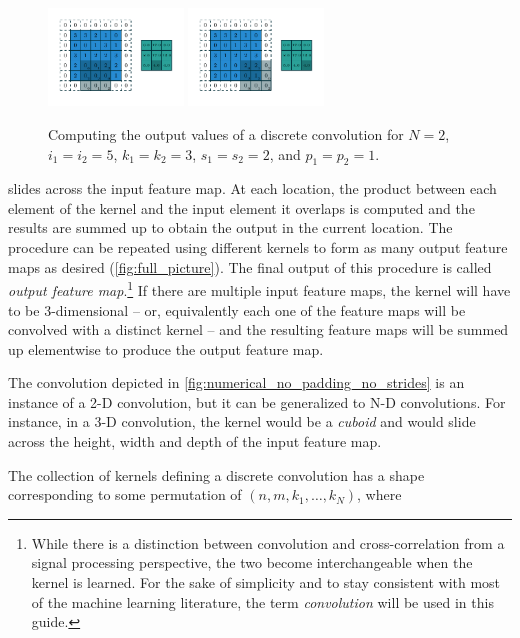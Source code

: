 \documentclass[notitlepage]{report}
\begin{document}
\begin{figure}[p]
    \includegraphics[width=0.32\textwidth]{pdf/numerical_padding_strides_07.pdf}
    \includegraphics[width=0.32\textwidth]{pdf/numerical_padding_strides_08.pdf}
    \caption{\label{fig:numerical_padding_strides} Computing the output values
        of a discrete convolution for $N = 2$, $i_1 = i_2 = 5$, $k_1 = k_2 = 3$,
        $s_1 = s_2 = 2$, and $p_1 = p_2 = 1$.}
\end{figure}

\noindent slides across the input feature map. At each location, the product
between each element of the kernel and the input element it overlaps is computed
and the results are summed up to obtain the output in the current location. The
procedure can be repeated using different kernels to form as many output feature
maps as desired (\autoref{fig:full_picture}). The final output of this procedure
is called
{\em output feature map}.\footnote{%
    While there is a distinction between convolution and cross-correlation from
    a signal processing perspective, the two become interchangeable when the
    kernel is learned. For the sake of simplicity and to stay consistent with
    most of the machine learning literature, the term {\em convolution}
    will be used in this guide.}
If there are multiple input feature maps, the kernel will have to be
3-dimensional -- or, equivalently each one of the feature maps will be
convolved with a distinct kernel -- and the resulting feature maps will
be summed up elementwise to produce the output feature map.

The convolution depicted in \autoref{fig:numerical_no_padding_no_strides} is an
instance of a 2-D convolution, but it can be generalized to N-D convolutions.
For instance, in a 3-D convolution, the kernel would be a {\em cuboid} and would
slide across the height, width and depth of the input feature map.

The collection of kernels defining a discrete convolution has a shape
corresponding to some permutation of $(n, m, k_1, \ldots, k_N)$, where
\end{document}
